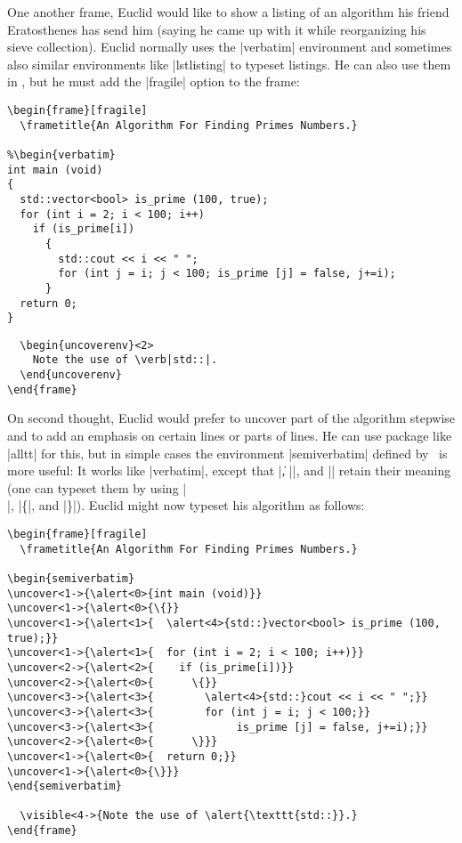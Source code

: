 One another frame, Euclid would like to show a listing of an
algorithm his friend Eratosthenes has send him (saying he came up with
it while reorganizing his sieve collection). Euclid normally uses the
|verbatim| environment and sometimes also similar environments like
|lstlisting| to typeset listings. He can also use them in \beamer, but
he must add the |fragile| option to the frame:
\begin{verbatim}
\begin{frame}[fragile]
  \frametitle{An Algorithm For Finding Primes Numbers.}

%\begin{verbatim}
int main (void)
{
  std::vector<bool> is_prime (100, true);
  for (int i = 2; i < 100; i++)
    if (is_prime[i])
      {
        std::cout << i << " ";
        for (int j = i; j < 100; is_prime [j] = false, j+=i);
      }
  return 0;
}
\end{verbatim}
\unskip{\MacroFont|\end{verbatim}|}
\begin{verbatim}
  \begin{uncoverenv}<2>
    Note the use of \verb|std::|.
  \end{uncoverenv}
\end{frame}
\end{verbatim}


On second thought, Euclid would prefer to uncover part of the
algorithm stepwise and to add an emphasis on certain lines or parts of
lines. He can use package like |alltt| for this, but in simple cases
the environment |{semiverbatim}| defined by \beamer\ is more useful:
It works like |{verbatim}|, except that |\|, |{|, and |}| retain their
meaning (one can typeset them by using |\\|, |\{|, and |\}|). Euclid
might now typeset his algorithm as follows:

\begin{verbatim}
\begin{frame}[fragile]
  \frametitle{An Algorithm For Finding Primes Numbers.}

\begin{semiverbatim}
\uncover<1->{\alert<0>{int main (void)}}
\uncover<1->{\alert<0>{\{}}
\uncover<1->{\alert<1>{  \alert<4>{std::}vector<bool> is_prime (100, true);}}
\uncover<1->{\alert<1>{  for (int i = 2; i < 100; i++)}}
\uncover<2->{\alert<2>{    if (is_prime[i])}}
\uncover<2->{\alert<0>{      \{}}
\uncover<3->{\alert<3>{        \alert<4>{std::}cout << i << " ";}}
\uncover<3->{\alert<3>{        for (int j = i; j < 100;}}
\uncover<3->{\alert<3>{             is_prime [j] = false, j+=i);}}
\uncover<2->{\alert<0>{      \}}}
\uncover<1->{\alert<0>{  return 0;}}
\uncover<1->{\alert<0>{\}}}
\end{semiverbatim}

  \visible<4->{Note the use of \alert{\texttt{std::}}.}
\end{frame}
\end{verbatim}

